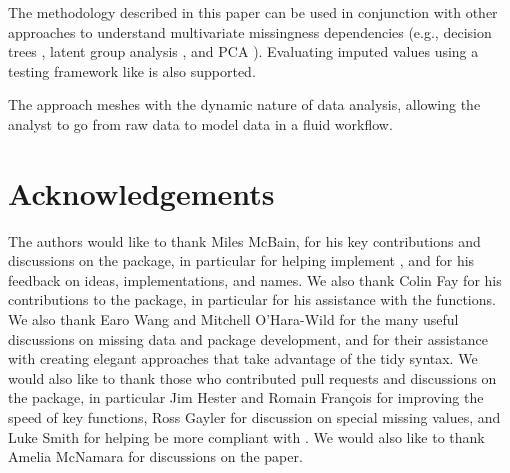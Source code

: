 \documentclass[
]{jss}
\begin{document}
The methodology described in this paper can be used in conjunction with other approaches to understand multivariate missingness dependencies (e.g., decision trees \citep{Tierney2015}, latent group analysis \citep{Barnett2017}, and PCA \citep{FactoMineR}). Evaluating imputed values using a testing framework like \citep{vanBuuren2018} is also supported.

The approach meshes with the dynamic nature of data analysis, allowing the analyst to go from raw data to model data in a fluid workflow.

\hypertarget{acknowledgements}{%
\section{Acknowledgements}\label{acknowledgements}}

The authors would like to thank Miles McBain, for his key contributions and discussions on the  package, in particular for helping implement , and for his feedback on ideas, implementations, and names. We also thank Colin Fay for his contributions to the  package, in particular for his assistance with the  functions. We also thank Earo Wang and Mitchell O'Hara-Wild for the many useful discussions on missing data and package development, and for their assistance with creating elegant approaches that take advantage of the tidy syntax. We would also like to thank those who contributed pull requests and discussions on the  package, in particular Jim Hester and Romain François for improving the speed of key functions, Ross Gayler for discussion on special missing values, and Luke Smith for helping  be more compliant with . We would also like to thank Amelia McNamara for discussions on the paper.

\renewcommand\refname{References}

\end{document}
